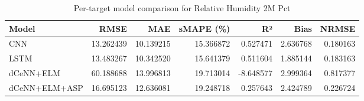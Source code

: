 \begin{table}
\caption{Per-target model comparison for Relative Humidity 2M Pct}
\begin{tabular}{lrrrrrr}
\toprule
Model & RMSE & MAE & sMAPE (\%) & R² & Bias & NRMSE \\
\midrule
CNN & 13.262439 & 10.139215 & 15.366872 & 0.527471 & 2.636768 & 0.180163 \\
LSTM & 13.483267 & 10.342520 & 15.641379 & 0.511604 & 1.885144 & 0.183163 \\
dCeNN+ELM & 60.188688 & 13.996813 & 19.713014 & -8.648577 & 2.999364 & 0.817377 \\
dCeNN+ELM+ASP & 16.695123 & 12.636081 & 19.248718 & 0.257643 & 2.424789 & 0.226724 \\
\bottomrule
\end{tabular}
\end{table}
